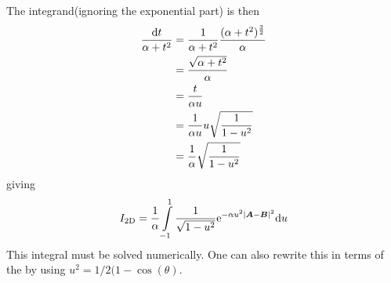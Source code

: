     The integrand(ignoring the exponential part) is then
        \begin{align}
            \frac{\mathrm{d} t}{\alpha + t^2} &= \frac{1}{\alpha + t^2} \frac{(\alpha +
            t^2)^{\frac{3}{2}}}{\alpha} \nonumber \\
            &= \frac{\sqrt{\alpha + t^2}}{\alpha} \nonumber \\
            &= \frac{t}{\alpha u} \nonumber \\
            &= \frac{1}{\alpha u} u\sqrt{\frac{1}{1-u^2}} \nonumber \\
            &= \frac{1}{\alpha}\sqrt{\frac{1}{1-u^2}}
        \end{align}
    giving
        \begin{align}
            I_{\text{2D}} = \frac{1}{\alpha}\int\limits^1_{-1}
            \frac{1}{\sqrt{1-u^2}} \mathrm{e}^{-\alpha u^2\abs{\boldsymbol{{A}} - \boldsymbol{{B}}}^2}
            \mathrm{d} u
            \label{eq:oneElectron2D}
        \end{align}
    This integral must be solved numerically. One can also rewrite this in terms of the  by using $u^2=1/2(1 - \cos(\theta)$.
